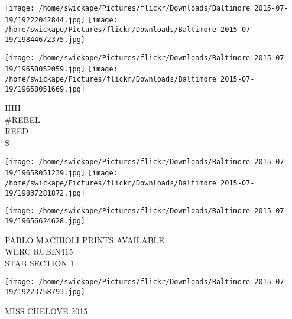\documentclass[10pt,letterpaper]{article}
\begin{document}
\texttt{[image: /home/swickape/Pictures/flickr/Downloads/Baltimore 2015-07-19/19222042844.jpg]}
\texttt{[image: /home/swickape/Pictures/flickr/Downloads/Baltimore 2015-07-19/19844672375.jpg]}

\texttt{[image: /home/swickape/Pictures/flickr/Downloads/Baltimore 2015-07-19/19658052059.jpg]}
\texttt{[image: /home/swickape/Pictures/flickr/Downloads/Baltimore 2015-07-19/19658051669.jpg]}

IIIII\\
\#REBEL\\
REED\\
S
\pagebreak

\texttt{[image: /home/swickape/Pictures/flickr/Downloads/Baltimore 2015-07-19/19658051239.jpg]}
\texttt{[image: /home/swickape/Pictures/flickr/Downloads/Baltimore 2015-07-19/19837281872.jpg]}

\vspace{0.25in}
\texttt{[image: /home/swickape/Pictures/flickr/Downloads/Baltimore 2015-07-19/19656624628.jpg]}

PABLO MACHIOLI PRINTS AVAILABLE\\
WERC RUBIN415\\
STAB SECTION 1
\pagebreak

\texttt{[image: /home/swickape/Pictures/flickr/Downloads/Baltimore 2015-07-19/19223758793.jpg]}

MISS CHELOVE 2015
\pagebreak
\end{document}
